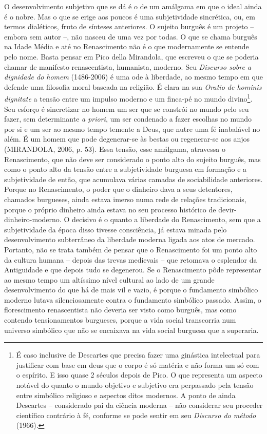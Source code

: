 O desenvolvimento subjetivo que se dá é o de um amálgama em que o ideal
ainda é o nobre. Mas o que se erige aos poucos é uma subjetividade
sincrética, ou, em termos dialéticos, fruto de sínteses anteriores. O
sujeito burguês é um projeto -- embora sem autor --, não nasceu de uma
vez por todas. O que se chama burguês na Idade Média e até no
Renascimento não é o que modernamente se entende pelo nome. Basta pensar
em Pico della Mirandola, que escreveu o que se poderia chamar de
manifesto renascentista, humanista, moderno. Seu \emph{Discurso sobre a
dignidade do homem} (1486-2006) é uma ode à liberdade, ao mesmo tempo em
que defende uma filosofia moral baseada na religião. É clara na sua
\emph{Oratio de hominis dignitate} a tensão entre um impulso moderno e
um finca-pé no mundo divino\footnote{É caso inclusive de Descartes que
  precisa fazer uma ginástica intelectual para justificar com base em
  deus que o corpo é só matéria e não forma um só com o espírito. E isso
  quase 2 séculos depois de Pico. O que representa um aspecto notável do
  quanto o mundo objetivo e subjetivo era perpassado pela tensão entre
  simbólico religioso e aspectos ditos modernos. A ponto de ainda
  Descartes -- considerado pai da ciência moderna -- não considerar seu
  proceder científico contrário à fé, conforme se pode sentir em seu
  \emph{Discurso do método} (1966).}. Seu esforço é sincretizar no homem
um ser que se constrói no mundo pelo seu fazer, sem determinante \emph{a
priori}, um ser condenado a fazer escolhas no mundo por si e um ser ao
mesmo tempo temente a Deus, que nutre uma fé inabalável no além. É um
homem que pode degenerar-se às bestas ou regenerar-se aos anjos
(MIRANDOLA, 2006, p. 53). Essa tensão, esse amálgama, atravessa o
Renascimento, que não deve ser considerado o ponto alto do sujeito
burguês, mas como o ponto alto da tensão entre a subjetividade burguesa
em formação e a subjetividade de então, que acumulava várias camadas de
sociabilidade anteriores. Porque no Renascimento, o poder que o dinheiro
dava a seus detentores, chamados burgueses, ainda estava imerso numa
rede de relações tradicionais, porque o próprio dinheiro ainda estava no
seu processo histórico de devir-dinheiro-moderno. O decisivo é o quanto
a liberdade do Renascimento, sem que a subjetividade da época disso
tivesse consciência, já estava minada pelo desenvolvimento subterrâneo
da liberdade moderna ligada aos atos de mercado. Portanto, não se trata
também de pensar que o Renascimento foi um ponto alto da cultura humana
-- depois das trevas medievais -- que retomava o esplendor da
Antiguidade e que depois tudo se degenerou. Se o Renascimento pôde
representar ao mesmo tempo um altíssimo nível cultural ao lado de um
grande desenvolvimento do que há de mais vil e vazio, é porque o
fundamento simbólico moderno lutava silenciosamente contra o fundamento
simbólico passado. Assim, o florescimento renascentista não deveria ser
visto como burguês, mas como contendo tensionamentos burgueses, porque a
vida social transcorria num universo simbólico que não se encaixava na
vida social burguesa que a superaria.

